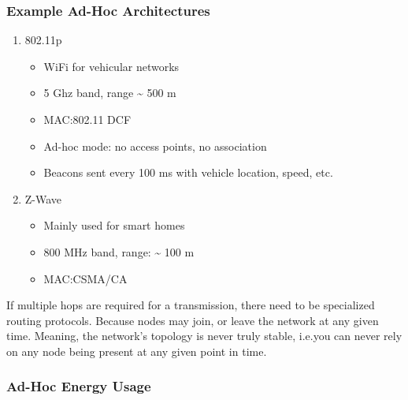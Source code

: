 \subsubsection{Example Ad-Hoc Architectures}\label{subsubsec:Ad_Hoc_Architectures}
\begin{enumerate}[noitemsep]
\item 802.11p
  \begin{itemize}[noitemsep]
  \item WiFi for vehicular networks
  \item 5 Ghz band, range \textasciitilde{} 500 m
  \item MAC:\@ 802.11 DCF
  \item Ad-hoc mode: no access points, no association
  \item Beacons sent every 100 ms with vehicle location, speed, etc.
  \end{itemize}

\item Z-Wave
  \begin{itemize}[noitemsep]
  \item Mainly used for smart homes
  \item 800 MHz band, range: \textasciitilde{} 100 m
  \item MAC:\@ CSMA/CA
  \end{itemize}
\end{enumerate}

\begin{remark*}
  If multiple hops are required for a transmission, there need to be specialized routing protocols.
  Because nodes may join, or leave the network at any given time.
  Meaning, the network's topology is never truly stable, i.e.\@ you can never rely on any node being present at any given point in time.
\end{remark*}

\subsubsection{Ad-Hoc Energy Usage}\label{subsubsec:Ad_Hoc_Architectures}

